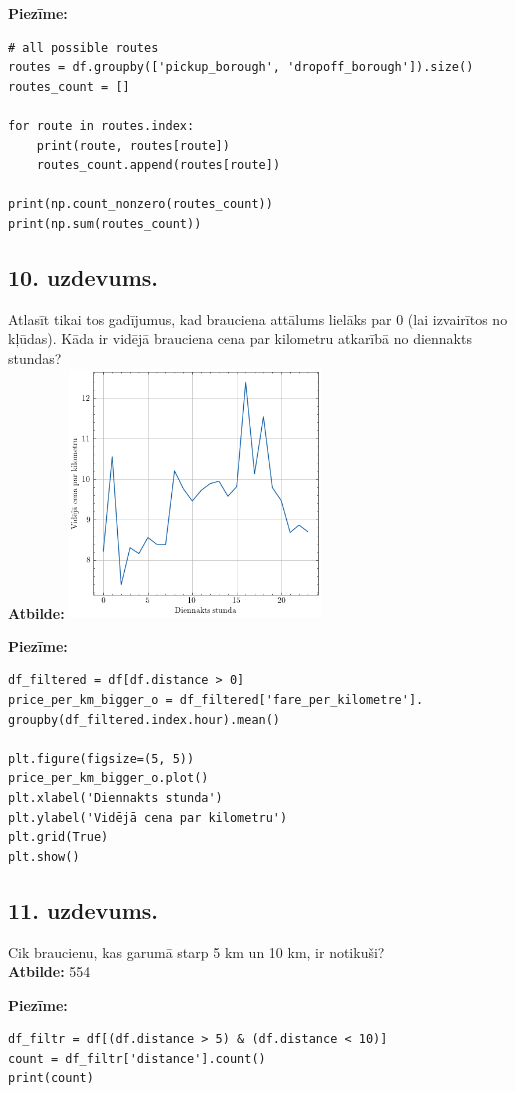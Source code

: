 \documentclass[12pt]{article}
\begin{document}
\noindent \textbf{Piezīme:}
\begin{verbatim}
# all possible routes
routes = df.groupby(['pickup_borough', 'dropoff_borough']).size()
routes_count = []

for route in routes.index:
    print(route, routes[route])
    routes_count.append(routes[route])

print(np.count_nonzero(routes_count))
print(np.sum(routes_count))
\end{verbatim}
\subsection*{10. uzdevums.} Atlasīt tikai tos gadījumus, kad brauciena attālums lielāks par 0 (lai izvairītos no kļūdas). Kāda ir vidējā brauciena cena par kilometru atkarībā no diennakts stundas?\\
\textbf{Atbilde:} \includegraphics[width=0.5\textwidth]{10.uzd..png}

\noindent \textbf{Piezīme:}
\begin{verbatim}
df_filtered = df[df.distance > 0]
price_per_km_bigger_o = df_filtered['fare_per_kilometre'].
groupby(df_filtered.index.hour).mean()

plt.figure(figsize=(5, 5))
price_per_km_bigger_o.plot()
plt.xlabel('Diennakts stunda')
plt.ylabel('Vidējā cena par kilometru')
plt.grid(True)
plt.show()
\end{verbatim}
\subsection*{11. uzdevums.} Cik braucienu, kas garumā starp 5 km un 10 km, ir notikuši?\\
\textbf{Atbilde:} 554

\noindent \textbf{Piezīme:}
\begin{verbatim}
df_filtr = df[(df.distance > 5) & (df.distance < 10)]
count = df_filtr['distance'].count()
print(count)
\end{verbatim}
\end{document}
